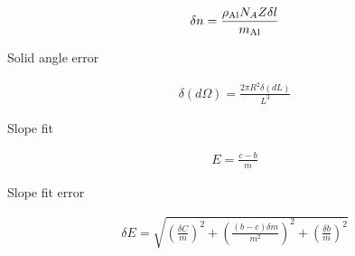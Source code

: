 \begin{align}
	\delta n = \frac{\rho_{\rm Al} N_A Z \delta l}{m_{\rm Al}}
\end{align}

Solid angle error

\begin{align}
	\delta (d\Omega)=
		\frac{2 \pi R^2 \delta (dL)}{L^3}
\end{align}

Slope fit

\begin{align}
	E=\frac{c-b}{m}
\end{align}

Slope fit error

\begin{align}
    \delta E = \sqrt{
    \left(\frac{\delta C}{m}\right)^2+
    \left(\frac{(b-c)\delta m}{m^2}\right)^2+
    \left(\frac{\delta b}{m}\right)^2
	}
\end{align}

